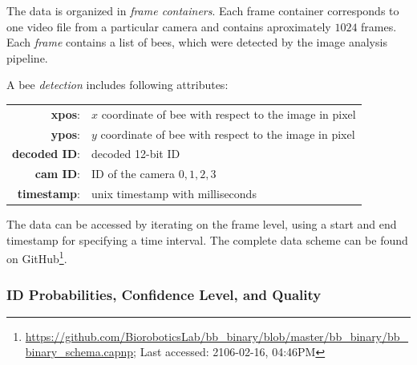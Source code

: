 The data is organized in \emph{frame containers}.
Each frame container corresponds to one video file from a particular camera and contains aproximately $1024$ frames.
Each \emph{frame} contains a list of bees, which were detected by the image analysis pipeline.

A bee \emph{detection} includes following attributes:

\begin{table}[!h]
\small
\centering
\begin{tabular}{rl}
\textbf{xpos}: & $x$ coordinate of bee with respect to the image in pixel \vspace{2mm}\\
\textbf{ypos}: & $y$ coordinate of bee with respect to the image in pixel \vspace{2mm}\\
\textbf{decoded ID}: & decoded 12-bit ID \vspace{2mm}\\
\textbf{cam ID}: & ID of the camera ${0,1,2,3}$ \vspace{2mm}\\
\textbf{timestamp}: & unix timestamp with milliseconds\\
\end{tabular}
\end{table}

The data can be accessed by iterating on the frame level, using a start and end time\-stamp for specifying a time interval. The complete data scheme can be found on GitHub\footnote{\url{https://github.com/BioroboticsLab/bb_binary/blob/master/bb_binary/bb_binary_schema.capnp}; Last accessed: 2106-02-16, 04:46PM}. 


\subsubsection{ID Probabilities, Confidence Level, and Quality}
\label{subsec:confidence}


